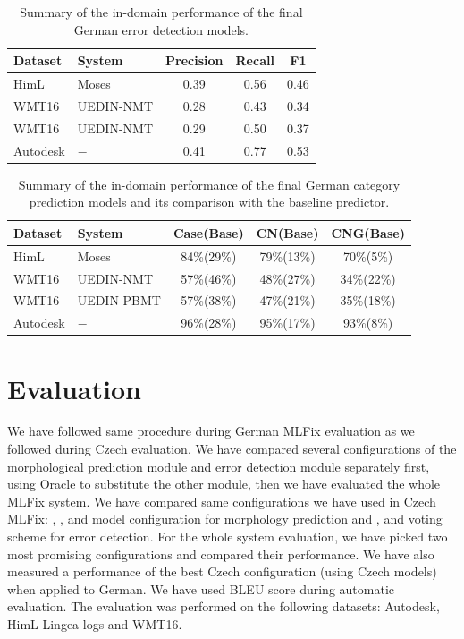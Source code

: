 \begin{table}[t]
\centering
\small

\begin{tabular}{ll|ccc}
Dataset  &  System  &  Precision  &  Recall  &  F1  \\
\hline
HimL  &  Moses  &  0.39  &  0.56  &  0.46  \\
WMT16 &  UEDIN-NMT  &  0.28  &  0.43  &  0.34  \\
WMT16 &  UEDIN-NMT  &  0.29  &  0.50  &  0.37  \\
Autodesk  &  $-$  &  0.41  &  0.77  &  0.53  \\
\end{tabular}
\caption{
    Summary of the in-domain performance of the final German error detection models.
}
\label{wf_de-summary}
\end{table}

\begin{table}[t]
\centering
\small

\begin{tabular}{ll|ccc}
Dataset  &  System  &  Case(Base)  &  CN(Base)  & CNG(Base)  \\
\hline
HimL  &  Moses  &  84\%(29\%)  &  79\%(13\%)  &  70\%(5\%)  \\
WMT16  &  UEDIN-NMT  &  57\%(46\%)  &  48\%(27\%)  &  34\%(22\%)  \\
WMT16  &  UEDIN-PBMT  &  57\%(38\%)  &  47\%(21\%)  &  35\%(18\%)\\
Autodesk  &  $-$  &  96\%(28\%)  &  95\%(17\%)  &  93\%(8\%)  \\

\end{tabular}
\caption{
    Summary of the in-domain performance of the final German category prediction models
	and its comparison with the baseline predictor.
}
\label{cats_de-summary}
\end{table}



\section{Evaluation}

We have followed same procedure during German MLFix evaluation as we followed during
Czech evaluation. We have compared several configurations of the morphological prediction
module and error detection module separately first, using Oracle to substitute the other
module, then we have evaluated the whole MLFix system. We have compared same configurations
we have used in Czech MLFix: , ,  and  model configuration for morphology
prediction and ,  and  voting scheme for error
detection. For the whole system evaluation, we have picked two most promising configurations
and compared their performance. We have also measured a performance of the best Czech configuration
(using Czech models) when applied to German. We have used BLEU score during automatic evaluation.
The evaluation was performed on the following datasets: Autodesk, HimL Lingea logs and WMT16.

